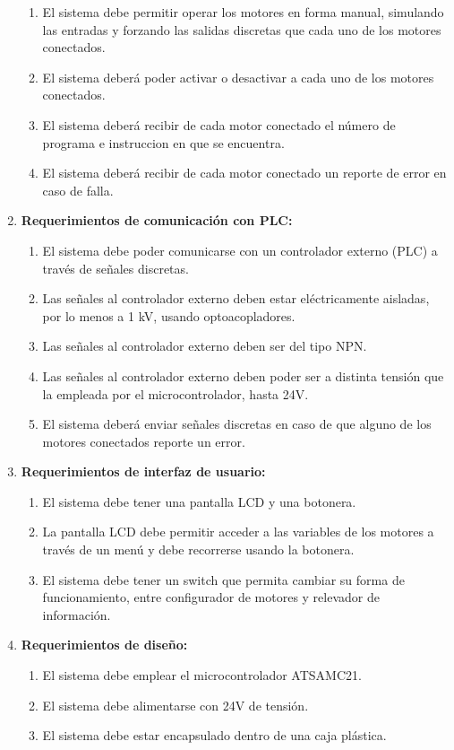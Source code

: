\documentclass[
11pt, %
]{charter}
\begin{document}
\begin{enumerate}
\begin{enumerate}
		\item El sistema debe permitir operar los motores en forma manual, simulando las entradas
y forzando las salidas discretas que cada uno de los motores conectados. \REQ
		\item El sistema deberá poder activar o desactivar a cada uno de los motores conectados. \REQ
		\item El sistema deberá recibir de cada motor conectado el número de
programa e instruccion en que se encuentra. \REQ
		\item El sistema deberá recibir de cada motor conectado un reporte de
error en caso de falla. \REQ
	\end{enumerate}
	\item \textbf{Requerimientos de comunicación con PLC:}
	\begin{enumerate}
		\item El sistema debe poder comunicarse con un controlador externo (PLC) a través de señales discretas. \REQ
		\item Las señales al controlador externo deben estar eléctricamente aisladas, por lo menos a 1 kV, usando optoacopladores. \REQ
		\item Las señales al controlador externo deben ser del tipo NPN. \REQ
		\item Las señales al controlador externo deben poder ser a distinta tensión que la empleada por el microcontrolador, hasta 24V. \REQ
		\item El sistema deberá enviar señales discretas en caso de que alguno de los motores
conectados reporte un error. \REQ
	\end{enumerate}
	\item \textbf{Requerimientos de interfaz de usuario:}
	\begin{enumerate}
		\item El sistema debe tener una pantalla LCD y una botonera. \REQ
		\item La pantalla LCD debe permitir acceder a las variables de los motores a través de un menú y debe recorrerse usando la botonera. \REQ
		\item El sistema debe tener un switch que permita cambiar su forma de funcionamiento, entre configurador de motores y relevador de información. \REQ
	\end{enumerate}
	\item \textbf{Requerimientos de diseño:}
	\begin{enumerate}
		\item El sistema debe emplear el microcontrolador ATSAMC21. \REQ
		\item El sistema debe alimentarse con 24V de tensión. \REQ
		\item El sistema debe estar encapsulado dentro de una caja plástica. \REQ
	\end{enumerate}
\end{enumerate}
\end{document}
